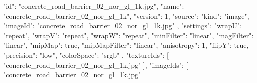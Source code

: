 {
  "id": "concrete_road_barrier_02_nor_gl_1k.jpg",
  "name": "concrete_road_barrier_02_nor_gl_1k",
  "version": 1,
  "source": {
    "kind": "image",
    "imageId": "concrete_road_barrier_02_nor_gl_1k.jpg"
  },
  "settings": {
    "wrapU": "repeat",
    "wrapV": "repeat",
    "wrapW": "repeat",
    "minFilter": "linear",
    "magFilter": "linear",
    "mipMap": true,
    "mipMapFilter": "linear",
    "anisotropy": 1,
    "flipY": true,
    "precision": "low",
    "colorSpace": "srgb"
  },
  "textureIds": [
    "concrete_road_barrier_02_nor_gl_1k.jpg"
  ],
  "imageIds": [
    "concrete_road_barrier_02_nor_gl_1k.jpg"
  ]
}
